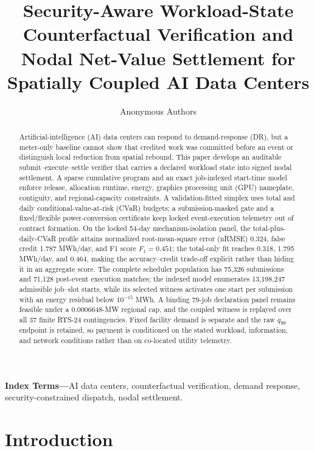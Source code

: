 \documentclass[10pt,journal]{IEEEtran}
\title{Security-Aware Workload-State Counterfactual Verification and\\
Nodal Net-Value Settlement for Spatially Coupled AI Data Centers}
\author{Anonymous Authors}
\begin{document}
\maketitle

\begin{abstract}
Artificial-intelligence (AI) data centers can respond to demand-response (DR),
but a meter-only baseline cannot show that credited work was committed before
an event or distinguish local reduction from spatial rebound. This paper
develops an auditable submit--execute--settle verifier that carries a declared
workload state into signed nodal settlement. A sparse cumulative program and an
exact job-indexed start-time model enforce release, allocation runtime, energy,
graphics processing unit (GPU) nameplate, contiguity, and regional-capacity
constraints. A validation-fitted simplex uses total and daily
conditional-value-at-risk (CVaR) budgets; a submission-masked gate and a
fixed/flexible power-conversion certificate keep locked event-execution
telemetry out of contract formation. On the locked 54-day
mechanism-isolation panel, the total-plus-daily-CVaR profile attains
normalized root-mean-square error (nRMSE) 0.324, false credit 1.787 MWh/day,
and F1 score \(F_1=0.451\); the total-only fit
reaches 0.318, 1.795 MWh/day, and 0.464, making the accuracy--credit
trade-off explicit rather than hiding it in an aggregate score. The complete
scheduler population has 75,326
submissions and 71,128 post-event execution matches; the indexed model
enumerates 13,198,247 admissible job--slot starts, while its selected witness
activates one start per submission with an energy residual below
\(10^{-15}\) MWh. A binding 79-job declaration panel remains feasible under a
0.0006648-MW regional cap, and the coupled witness is replayed over all 37
finite RTS-24 contingencies. Fixed facility demand is separate and the raw
\(q_{99}\) endpoint is retained, so payment is conditioned on the stated
workload, information, and network conditions rather than on co-located utility
telemetry.
\end{abstract}

\noindent\textbf{Index Terms---}AI data centers, counterfactual verification,
demand response, security-constrained dispatch, nodal settlement.

\section{Introduction}
\end{document}
